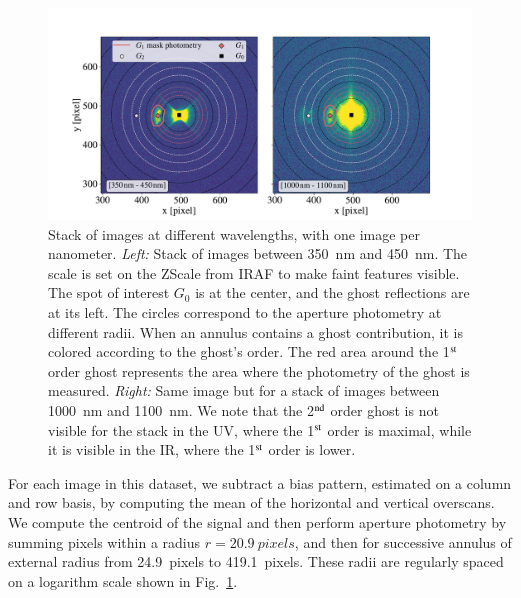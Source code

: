 \begin{figure}[h]
    \centering
    \includegraphics[width=\columnwidth]{fig/ghost_contrast.pdf}
    \caption{Stack of images at different wavelengths, with one image per nanometer. \textit{Left:} Stack of images between \SI{350}{\nano\meter} and \SI{450}{\nano\meter}. The scale is set on the ZScale from IRAF to make faint features visible. The spot of interest $G_0$ is at the center, and the ghost reflections are at its left. The circles correspond to the aperture photometry at different radii. When an annulus contains a ghost contribution, it is colored according to the ghost's order. The red area around the 1$\textsuperscript{st}$ order ghost represents the area where the photometry of the ghost is measured. \textit{Right:} Same image but for a stack of images between \SI{1000}{\nano\meter} and \SI{1100}{\nano\meter}. We note that the 2$\textsuperscript{nd}$ order ghost is not visible for the stack in the UV, where the 1$\textsuperscript{st}$ order is maximal, while it is visible in the IR, where the 1$\textsuperscript{st}$ order is lower.}
    \label{fig:ghost_contrast}
\end{figure}

For each image in this dataset, we subtract a bias pattern, estimated on a column and row basis, by computing the mean of the horizontal and vertical overscans. We compute the centroid of the signal and then perform aperture photometry by summing pixels within a radius $r=\SI{20.9}{pixels}$, and then for successive annulus of external radius from \SI{24.9}{pixels} to \SI{419.1}{pixels}. These radii are regularly spaced on a logarithm scale shown in Fig.~\ref{fig:ghost_contrast}.

